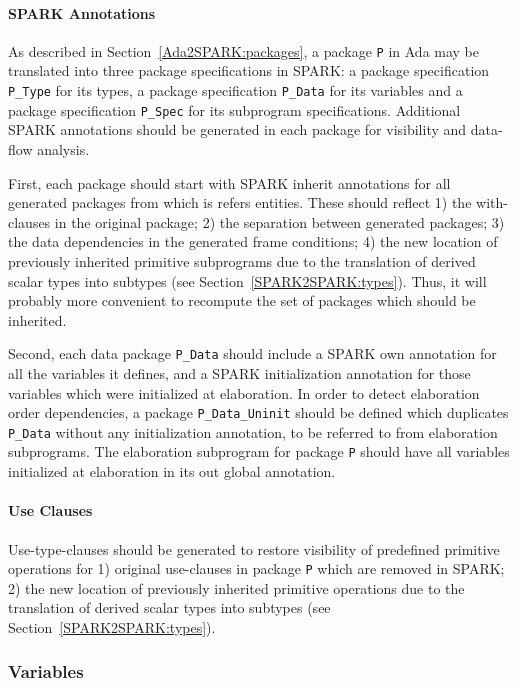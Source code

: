 \documentclass{article}
\begin{document}
\paragraph{SPARK Annotations}

As described in Section~\ref{Ada2SPARK:packages}, a package \verb|P| in Ada may
be translated into three package specifications in SPARK: a package
specification \verb|P_Type| for its types, a package specification
\verb|P_Data| for its variables and a package specification \verb|P_Spec| for
its subprogram specifications. Additional SPARK annotations should be generated
in each package for visibility and data-flow analysis.

First, each package should start with SPARK inherit annotations for all
generated packages from which is refers entities. These should reflect 1) the
with-clauses in the original package; 2) the separation between generated
packages; 3) the data dependencies in the generated frame conditions; 4) the
new location of previously inherited primitive subprograms due to the
translation of derived scalar types into subtypes (see
Section~\ref{SPARK2SPARK:types}). Thus, it will probably more convenient to
recompute the set of packages which should be inherited.

Second, each data package \verb|P_Data| should include a SPARK own annotation
for all the variables it defines, and a SPARK initialization annotation for
those variables which were initialized at elaboration. In order to detect
elaboration order dependencies, a package \verb|P_Data_Uninit| should be
defined which duplicates \verb|P_Data| without any initialization annotation,
to be referred to from elaboration subprograms. The elaboration subprogram for
package \verb|P| should have all variables initialized at elaboration in its
out global annotation.

\paragraph{Use Clauses}

Use-type-clauses should be generated to restore visibility of predefined
primitive operations for 1) original use-clauses in package \verb|P| which are
removed in SPARK; 2) the new location of previously inherited primitive
operations due to the translation of derived scalar types into subtypes (see
Section~\ref{SPARK2SPARK:types}).

\subsubsection{Variables}
\label{SPARK2SPARK:variables}
\end{document}
